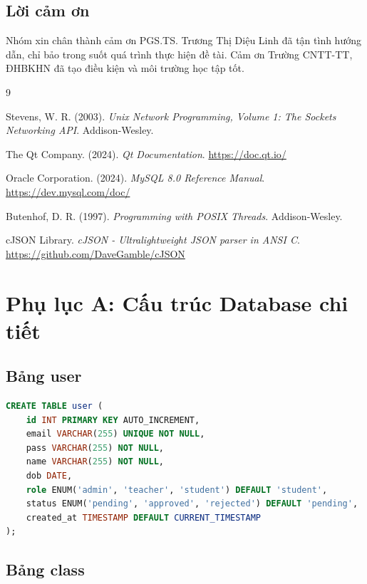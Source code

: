 \documentclass[12pt,a4paper]{report}
\begin{document}
\section{Lời cảm ơn}

Nhóm xin chân thành cảm ơn PGS.TS. Trương Thị Diệu Linh đã tận tình hướng dẫn, chỉ bảo trong suốt quá trình thực hiện đề tài. Cảm ơn Trường CNTT-TT, ĐHBKHN đã tạo điều kiện và môi trường học tập tốt.

\begin{thebibliography}{9}

Stevens, W. R. (2003). \textit{Unix Network Programming, Volume 1: The Sockets Networking API}. Addison-Wesley.

The Qt Company. (2024). \textit{Qt Documentation}. \url{https://doc.qt.io/}

Oracle Corporation. (2024). \textit{MySQL 8.0 Reference Manual}. \url{https://dev.mysql.com/doc/}

Butenhof, D. R. (1997). \textit{Programming with POSIX Threads}. Addison-Wesley.

cJSON Library. \textit{cJSON - Ultralightweight JSON parser in ANSI C}. \url{https://github.com/DaveGamble/cJSON}

\end{thebibliography}

\appendix

\chapter{Phụ lục A: Cấu trúc Database chi tiết}

\section{Bảng user}

\begin{lstlisting}[language=SQL]
CREATE TABLE user (
    id INT PRIMARY KEY AUTO_INCREMENT,
    email VARCHAR(255) UNIQUE NOT NULL,
    pass VARCHAR(255) NOT NULL,
    name VARCHAR(255) NOT NULL,
    dob DATE,
    role ENUM('admin', 'teacher', 'student') DEFAULT 'student',
    status ENUM('pending', 'approved', 'rejected') DEFAULT 'pending',
    created_at TIMESTAMP DEFAULT CURRENT_TIMESTAMP
);
\end{lstlisting}

\section{Bảng class}
\end{document}
